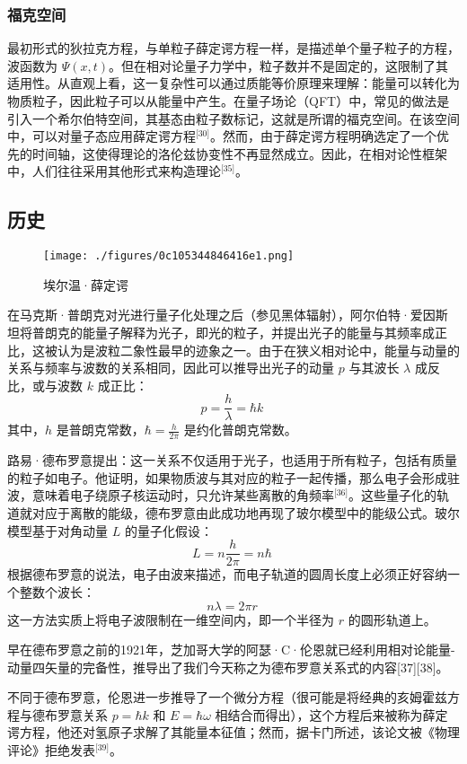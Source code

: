 \subsubsection{福克空间}
最初形式的狄拉克方程，与单粒子薛定谔方程一样，是描述单个量子粒子的方程，波函数为 $\Psi(x, t)$。但在相对论量子力学中，粒子数并不是固定的，这限制了其适用性。从直观上看，这一复杂性可以通过质能等价原理来理解：能量可以转化为物质粒子，因此粒子可以从能量中产生。在量子场论（QFT）中，常见的做法是引入一个希尔伯特空间，其基态由粒子数标记，这就是所谓的福克空间。在该空间中，可以对量子态应用薛定谔方程\(^\text{[30]}\)。然而，由于薛定谔方程明确选定了一个优先的时间轴，这使得理论的洛伦兹协变性不再显然成立。因此，在相对论性框架中，人们往往采用其他形式来构造理论\(^\text{[35]}\)。
\subsection{历史}
\begin{figure}[ht]
\centering
\texttt{[image: ./figures/0c105344846416e1.png]}
\caption{埃尔温·薛定谔} \label{fig_XDEfc_6}
\end{figure}
在马克斯·普朗克对光进行量子化处理之后（参见黑体辐射），阿尔伯特·爱因斯坦将普朗克的能量子解释为光子，即光的粒子，并提出光子的能量与其频率成正比，这被认为是波粒二象性最早的迹象之一。由于在狭义相对论中，能量与动量的关系与频率与波数的关系相同，因此可以推导出光子的动量 $p$ 与其波长 $\lambda$ 成反比，或与波数 $k$ 成正比：
$$
p = \frac{h}{\lambda} = \hbar k~
$$
其中，$h$ 是普朗克常数，$\hbar = \frac{h}{2\pi}$ 是约化普朗克常数。

路易·德布罗意提出：这一关系不仅适用于光子，也适用于所有粒子，包括有质量的粒子如电子。他证明，如果物质波与其对应的粒子一起传播，那么电子会形成驻波，意味着电子绕原子核运动时，只允许某些离散的角频率\(^\text{[36]}\)。这些量子化的轨道就对应于离散的能级，德布罗意由此成功地再现了玻尔模型中的能级公式。玻尔模型基于对角动量 $L$ 的量子化假设：
$$
L = n \frac{h}{2\pi} = n\hbar~
$$
根据德布罗意的说法，电子由波来描述，而电子轨道的圆周长度上必须正好容纳一个整数个波长：
$$
n\lambda = 2\pi r~
$$
这一方法实质上将电子波限制在一维空间内，即一个半径为 $r$ 的圆形轨道上。

早在德布罗意之前的1921年，芝加哥大学的阿瑟·C·伦恩就已经利用相对论能量-动量四矢量的完备性，推导出了我们今天称之为德布罗意关系式的内容[37][38]。

不同于德布罗意，伦恩进一步推导了一个微分方程（很可能是将经典的亥姆霍兹方程与德布罗意关系
$p = \hbar k$ 和 $E = \hbar \omega$ 相结合而得出），这个方程后来被称为薛定谔方程，他还对氢原子求解了其能量本征值；然而，据卡门所述，该论文被《物理评论》拒绝发表\(^\text{[39]}\)。

